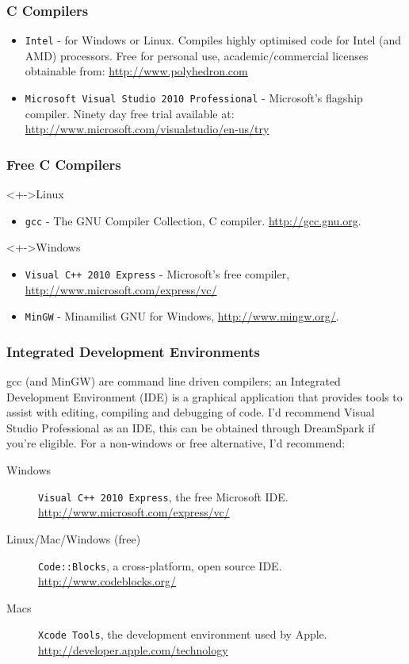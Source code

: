 \documentclass[smaller,table]{beamer} %
\begin{document}
\begin{frame}
\frametitle{C Compilers}
\begin{itemize}
\item {\tt Intel} - for Windows or Linux. Compiles highly optimised code for Intel (and AMD) processors. Free for personal use, academic/commercial licenses obtainable from:
\url{http://www.polyhedron.com}
\item{\tt Microsoft Visual Studio 2010 Professional} - Microsoft's flagship compiler. Ninety day free trial available at:
\url{http://www.microsoft.com/visualstudio/en-us/try}
\end{itemize}
\end{frame}

\begin{frame}
\frametitle{Free C Compilers}
\begin{block}<+->{Linux}
\begin{itemize}
\item {\tt gcc} - The GNU Compiler Collection, C compiler.
\url{http://gcc.gnu.org}.
\end{itemize}
\begin{block}<+->{Windows}
\begin{itemize}
\item {\tt Visual C++ 2010 Express} - Microsoft's free compiler,
\url{http://www.microsoft.com/express/vc/}
\item {\tt MinGW} - Minamilist GNU for Windows,
\url{http://www.mingw.org/}.
\end{itemize}
\end{block}
\end{block}
\end{frame}

\begin{frame}
\frametitle{Integrated Development Environments}
gcc (and MinGW) are command line driven compilers; an Integrated Development Environment (IDE) is a graphical application that provides tools to assist with editing, compiling and debugging of code. I'd recommend Visual Studio Professional as an IDE, this can be obtained through DreamSpark if you're eligible. For a non-windows or free alternative, I'd recommend:
\begin{block}{}
\begin{description}
\item[Windows] \texttt{Visual C++ 2010 Express}, the free Microsoft IDE. \url{http://www.microsoft.com/express/vc/}
\item[Linux/Mac/Windows (free)] \texttt{Code::Blocks}, a cross-platform, open source IDE. \url{http://www.codeblocks.org/}
\item [Macs] \texttt{Xcode Tools}, the development environment used by Apple. \url{http://developer.apple.com/technology}
\end{description}
\end{block}
\end{frame}
\end{document}
